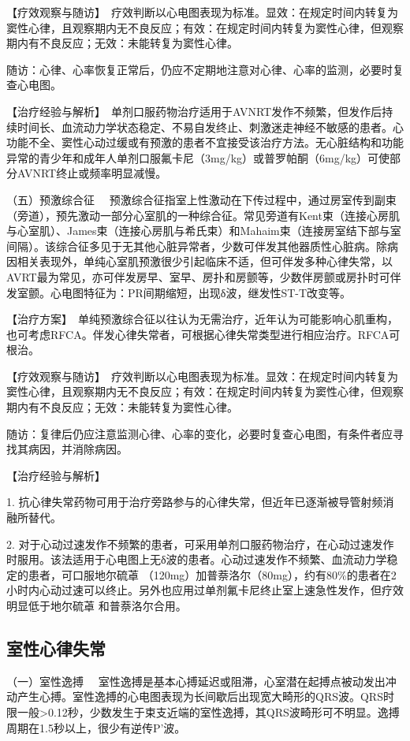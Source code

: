 【疗效观察与随访】　疗效判断以心电图表现为标准。显效：在规定时间内转复为窦性心律，且观察期内无不良反应；有效：在规定时间内转复为窦性心律，但观察期内有不良反应；无效：未能转复为窦性心律。

随访：心律、心率恢复正常后，仍应不定期地注意对心律、心率的监测，必要时复查心电图。

【治疗经验与解析】　单剂口服药物治疗适用于AVNRT发作不频繁，但发作后持续时间长、血流动力学状态稳定、不易自发终止、刺激迷走神经不敏感的患者。心功能不全、窦性心动过缓或有预激的患者不宜接受该治疗方法。无心脏结构和功能异常的青少年和成年人单剂口服氟卡尼（3mg/kg）或普罗帕酮（6mg/kg）可使部分AVNRT终止或频率明显减慢。

{（五）预激综合征}
　预激综合征指室上性激动在下传过程中，通过房室传到副束（旁道），预先激动一部分心室肌的一种综合征。常见旁道有Kent束（连接心房肌与心室肌）、James束（连接心房肌与希氏束）和Mahaim束（连接房室结下部与室间隔）。该综合征多见于无其他心脏异常者，少数可伴发其他器质性心脏病。除病因相关表现外，单纯心室肌预激很少引起临床不适，但可伴发多种心律失常，以AVRT最为常见，亦可伴发房早、室早、房扑和房颤等，少数伴房颤或房扑时可伴发室颤。心电图特征为：PR间期缩短，出现δ波，继发性ST-T改变等。

【治疗方案】　单纯预激综合征以往认为无需治疗，近年认为可能影响心肌重构，也可考虑RFCA。伴发心律失常者，可根据心律失常类型进行相应治疗。RFCA可根治。

【疗效观察与随访】　疗效判断以心电图表现为标准。显效：在规定时间内转复为窦性心律，且观察期内无不良反应；有效：在规定时间内转复为窦性心律，但观察期内有不良反应；无效：未能转复为窦性心律。

随访：复律后仍应注意监测心律、心率的变化，必要时复查心电图，有条件者应寻找其病因，并消除病因。

【治疗经验与解析】

1.
抗心律失常药物可用于治疗旁路参与的心律失常，但近年已逐渐被导管射频消融所替代。

2.
对于心动过速发作不频繁的患者，可采用单剂口服药物治疗，在心动过速发作时服用。该法适用于心电图上无δ波的患者。心动过速发作不频繁、血流动力学稳定的患者，可口服地尔硫䓬
（120mg）加普萘洛尔（80mg），约有80\%的患者在2小时内心动过速可以终止。另外也应用过单剂氟卡尼终止室上速急性发作，但疗效明显低于地尔硫䓬
和普萘洛尔合用。

\subsection{室性心律失常}

{（一）室性逸搏}
　室性逸搏是基本心搏延迟或阻滞，心室潜在起搏点被动发出冲动产生心搏。室性逸搏的心电图表现为长间歇后出现宽大畸形的QRS波。QRS时限一般\textgreater{}0.12秒，少数发生于束支近端的室性逸搏，其QRS波畸形可不明显。逸搏周期在1.5秒以上，很少有逆传P'波。

